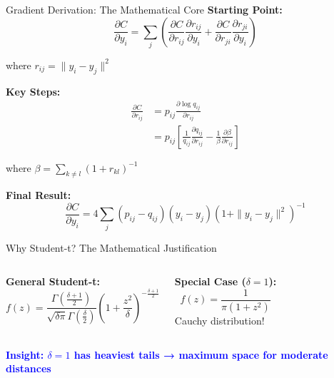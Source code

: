 \documentclass[aspectratio=169]{beamer}
\newcommand{\conceptbox}[2]{\colorbox{#1!20}{\textcolor{#1}{\textbf{#2}}}}
\newcommand{\insight}[1]{\conceptbox{blue}{Insight: #1}}
\begin{document}
\begin{frame}{Gradient Derivation: The Mathematical Core}
\textbf{Starting Point:}
$$\frac{\partial C}{\partial y_i} = \sum_j \left(\frac{\partial C}{\partial r_{ij}} \frac{\partial r_{ij}}{\partial y_i} + \frac{\partial C}{\partial r_{ji}} \frac{\partial r_{ji}}{\partial y_i}\right)$$

where $r_{ij} = \|y_i - y_j\|^2$

\textbf{Key Steps:}
\begin{align*}
\frac{\partial C}{\partial r_{ij}} &= p_{ij} \frac{\partial \log q_{ij}}{\partial r_{ij}} \\
&= p_{ij} \left[\frac{1}{q_{ij}} \frac{\partial q_{ij}}{\partial r_{ij}} - \frac{1}{\beta} \frac{\partial \beta}{\partial r_{ij}}\right]
\end{align*}

where $\beta = \sum_{k \neq l} (1 + r_{kl})^{-1}$

\textbf{Final Result:}
$$\boxed{\frac{\partial C}{\partial y_i} = 4\sum_j (p_{ij} - q_{ij})(y_i - y_j)(1 + \|y_i - y_j\|^2)^{-1}}$$
\end{frame}

\begin{frame}{Why Student-t? The Mathematical Justification}
\begin{columns}
\textbf{General Student-t:}
$$f(z) = \frac{\Gamma(\frac{\delta+1}{2})}{\sqrt{\delta\pi}\Gamma(\frac{\delta}{2})}\left(1 + \frac{z^2}{\delta}\right)^{-\frac{\delta+1}{2}}$$

\textbf{Special Case ($\delta=1$):}
$$f(z) = \frac{1}{\pi(1 + z^2)}$$
Cauchy distribution!

\begin{center}
\end{center}
\end{columns}

\vspace{0.3cm}
\insight{$\delta=1$ has heaviest tails → maximum space for moderate distances}
\end{frame}
\end{document}
